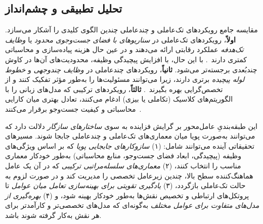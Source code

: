 \subsection{تحلیل تطبیقی و چشم‌انداز}
\label{subsec:agent-comparative}

مقایسه جامع رویکردهای تک‌عاملی و چندعاملی چندین الگوی کلیدی را آشکار می‌سازد. \textbf{اولاً}، رویکردهای تک‌عاملی در \emph{سناریوهای با فضای جست‌وجوی محدود} یا \emph{وظایف تک‌هدفه} عملکرد رقابتی ارائه می‌دهند و در عین حال هزینه پیاده‌سازی و محاسباتی کمتری دارند~\cite{zhang2023usingLLMforHPO,zheng2023GENIUS,ji2025RZNAS}. با این حال، با افزایش پیچیدگی وظیفه، محدودیت‌های آن‌ها در کاوش چندبُعدی برجسته‌تر می‌شود. \textbf{ثانیاً}، رویکردهای چندعاملی در \emph{وظایف چندوجهی} و \emph{خطوط لوله پیچیده} برتری دارند، زیرا می‌توانند مسئولیت‌ها را به‌طور مؤثر تفکیک کنند و از تخصص‌گرایی بهره بگیرند~\cite{trirat2025automlagent,liu2024LLAMBO,Yang2025NADER}. \textbf{ثالثاً}، رویکردهای ترکیبی که مدل‌های زبانی را با الگوریتم‌های کلاسیک (تکاملی یا بیزی) ادغام می‌کنند، تعادل بهتری میان کارایی محاسباتی و کیفیت جست‌وجو برقرار می‌کنند~\cite{LLMatic2024,chen2023Evoprompting,liu2024LLAMBO}.

این طبقه‌بندیِ عامل‌محور بر گرایش فزاینده به سوی \emph{ساختارهای سازگار} دلالت دارد که می‌توانند به‌صورت پویا میان معماری‌های تک‌عاملی و چندعاملی جابجا شوند. مسیرهای تحقیقاتی آینده می‌توانند شامل: (۱) \emph{سازوکارهای جابجایی پویا} که بر اساس ویژگی‌های وظیفه (پیچیدگی، ابعاد فضای جست‌وجو، منابع محاسباتی) به‌طور خودکار معماری مناسب را انتخاب کنند، (۲) \emph{معماری‌های سلسله‌مراتبی ترکیبی} که در آن یک عامل هماهنگ‌کننده سطح بالا، چندین زیرعامل تخصصی را مدیریت کند و در صورت لزوم به حالت تک‌عاملی بازگردد، (۳) \emph{یادگیری تقویتی برای بهینه‌سازی تعامل میان عوامل} تا پروتکل‌های ارتباطی و تخصیص نقش‌ها به‌طور خودکار بهینه شود، و (۴) \emph{بهره‌گیری از مدل‌های متفاوت برای عوامل مختلف} به‌گونه‌ای که مدل‌های تخصصی‌تر و کارآمدتر برای هر نقش به‌کار گرفته شوند باشد.
